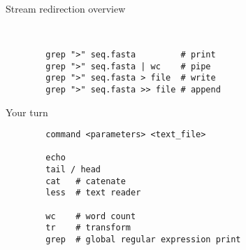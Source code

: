 \documentclass[xcolor=dvipsnames]{beamer}
\begin{document}
\begin{frame}[fragile]
	\huge
	Stream redirection overview
	\Large
	\begin{verbatim}
		
	
		grep ">" seq.fasta         # print
		grep ">" seq.fasta | wc    # pipe
		grep ">" seq.fasta > file  # write
		grep ">" seq.fasta >> file # append
	\end{verbatim}
\end{frame}

\begin{frame}[fragile]
	\huge
	Your turn
	\Large
	\begin{verbatim}
		command <parameters> <text_file>	
	
		echo
		tail / head
		cat   # catenate
		less  # text reader
		
		wc    # word count
		tr    # transform
		grep  # global regular expression print 
	\end{verbatim}
\end{frame}
\end{document}
